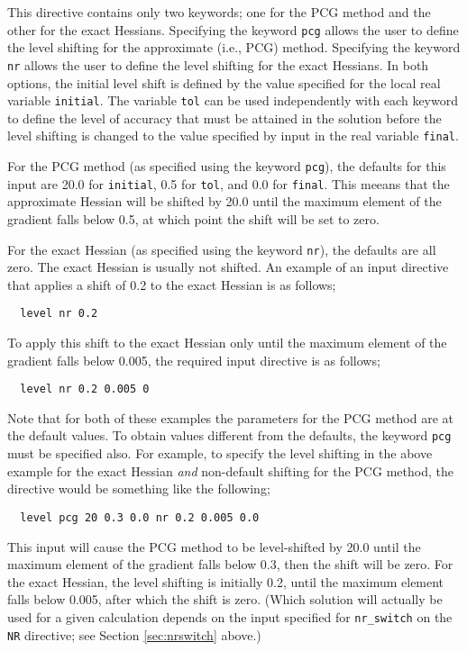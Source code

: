 This directive contains only two keywords; one for the PCG method and the
other for the exact Hessians.  Specifying the keyword \verb+pcg+ 
allows the user to define the level shifting for the approximate 
(i.e., PCG) method.  Specifying the keyword \verb+nr+ allows the user
to define the level shifting for the exact Hessians.  In both options,
the initial level shift is defined by the value specified for the local
real variable \verb+initial+.  The variable \verb+tol+ can be used 
independently with each keyword to define the level of accuracy that must
be attained in the solution before the level shifting is changed to the
value specified by input in the real variable \verb+final+.

For the PCG method (as specified using the keyword \verb+pcg+), the
defaults for this input are 20.0 for \verb+initial+, 0.5 for \verb+tol+,
and 0.0 for \verb+final+.  This meeans that the approximate Hessian will
be shifted by 20.0 until the maximum element of
the gradient falls below 0.5, at which point the shift will be set to zero.

For the exact Hessian (as specified using the keyword \verb+nr+), the
defaults are all zero.  The exact Hessian is usually not shifted.  An
example of an input directive that applies a shift of 0.2 to 
the exact Hessian is as follows;

\begin{verbatim}
  level nr 0.2
\end{verbatim}

To apply this shift to the exact Hessian only until the
maximum element of the gradient falls below 0.005, the required input
directive is as follows;

\begin{verbatim}
  level nr 0.2 0.005 0
\end{verbatim}

Note that for both of these examples the parameters for the PCG method 
are at the default values.  To obtain values different from the defaults,
the keyword \verb+pcg+ must be specified also.  For example, to specify
the level shifting in the above example for the exact Hessian {\em and} 
non-default shifting for the PCG method, the directive would be something
like the following;

\begin{verbatim}
  level pcg 20 0.3 0.0 nr 0.2 0.005 0.0
\end{verbatim}

This input will cause the PCG method to be level-shifted by 20.0 until the
maximum element of the gradient falls below 0.3, then the shift will be
zero.  For the exact Hessian, the level shifting is initially 0.2, until
the maximum element falls below 0.005, after which the shift is zero.
(Which solution will actually be used for a given calculation depends on
the input specified for \verb+nr_switch+ on the \verb+NR+ directive; see
Section \ref{sec:nrswitch} above.)

